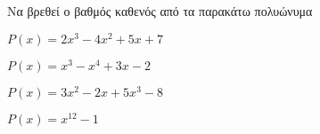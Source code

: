 Να βρεθεί ο βαθμός καθενός από τα παρακάτω πολυώνυμα
\begin{multicols}{2}
\begin{alist}
\item $ P(x)=2x^3-4x^2+5x+7 $
\item $ P(x)=x^3-x^4+3x-2 $
\item $ P(x)=3x^2-2x+5x^3-8 $
\item $ P(x)=x^{12}-1 $
\end{alist}
\end{multicols}
